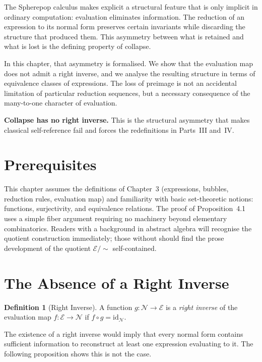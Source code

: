 \documentclass[12pt, oneside]{amsbook}
\theoremstyle{plain}
\theoremstyle{definition}
\newtheorem{definition}[theorem]{Definition}
\theoremstyle{remark}
\newcommand{\Expr}{\mathcal{E}}
\newcommand{\NF}{\mathcal{N}}
\newcommand{\evalf}{f}
\newcommand{\tequiv}{\sim}
\begin{document}
The Spherepop calculus makes explicit a structural feature that is only implicit
in ordinary computation: evaluation eliminates information. The reduction of an
expression to its normal form preserves certain invariants while discarding the
structure that produced them. This asymmetry between what is retained and what
is lost is the defining property of collapse.

In this chapter, that asymmetry is formalised. We show that the evaluation map
does not admit a right inverse, and we analyse the resulting structure in terms
of equivalence classes of expressions. The loss of preimage is not an accidental
limitation of particular reduction sequences, but a necessary consequence of the
many-to-one character of evaluation.

\begin{tcolorbox}[hinge, title={Part II Hinge}]
  \textbf{Collapse has no right inverse.} This is the structural asymmetry that
  makes classical self-reference fail and forces the redefinitions in Parts~III
  and~IV.
\end{tcolorbox}

\section{Prerequisites}

This chapter assumes the definitions of Chapter~3 (expressions, bubbles, reduction rules, evaluation map) and familiarity with basic set-theoretic notions: functions, surjectivity, and equivalence relations. The proof of Proposition~4.1 uses a simple fiber argument requiring no machinery beyond elementary combinatorics. Readers with a background in abstract algebra will recognise the quotient construction immediately; those without should find the prose development of the quotient $\Expr/{\tequiv}$ self-contained.

\section{The Absence of a Right Inverse}
\label{sec:collapse:noinverse}

\begin{definition}[Right Inverse]
\label{def:right-inverse}
A function $g : \NF \to \Expr$ is a \emph{right inverse} of the evaluation map
$\evalf : \Expr \to \NF$ if $\evalf \circ g = \mathrm{id}_{\NF}$.
\end{definition}

The existence of a right inverse would imply that every normal form contains
sufficient information to reconstruct at least one expression evaluating to it.
The following proposition shows this is not the case.
\end{document}
